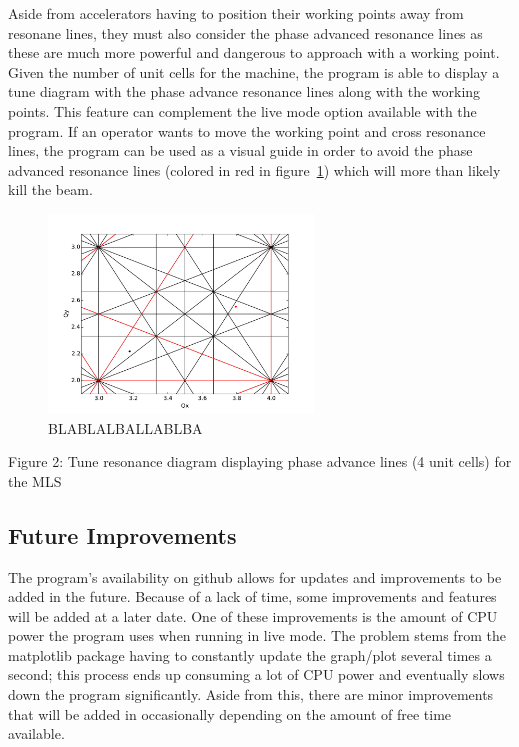 \documentclass[%
 reprint,%
 amssymb, amsmath,%
 aip,cha,%
]{revtex4-1}
\begin{document}
Aside from accelerators having to position their working points away from resonane lines, they must also consider the phase advanced resonance lines as these are much more powerful and dangerous to approach with a working point. Given the number of unit cells for the machine, the program is able to display a tune diagram with the phase advance resonance lines along with the working points. This feature can complement the live mode option available with the program. If an operator wants to move the working point and cross resonance lines, the program can be used as a visual guide in order to avoid the phase advanced resonance lines (colored in red in figure~\ref{fig1}) which will more than likely kill the beam.
\begin{figure}[htb]
\begin{center}
\includegraphics[width=200pt]{image.pdf}
\caption{BLABLALBALLABLBA}
\label{fig1}
\end{center}
\end{figure}
Figure 2: Tune resonance diagram displaying phase advance lines (4 unit cells) for the MLS

\subsection{Future Improvements}
The program's availability on github\cite{Note1} allows for updates and improvements to be added in the future. Because of a lack of time, some improvements and features will be added at a later date. One of these improvements is the amount of CPU power the program uses when running in live mode. The problem stems from the matplotlib package having to constantly update the graph/plot several times a second; this process ends up consuming a lot of CPU power and eventually slows down the program significantly. Aside from this, there are minor improvements that will be added in occasionally depending on the amount of free time available.
\end{document}

